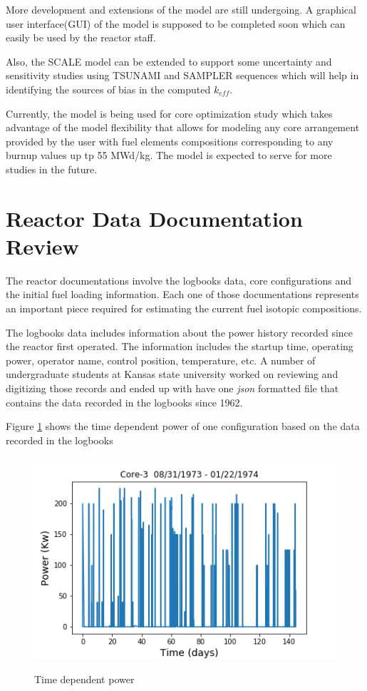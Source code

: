 \documentclass[review,number,sort&compress,12pt]{elsarticle}
\begin{document}
More development and extensions of the model are still undergoing. A graphical user interface(GUI) of the model is supposed to be completed soon which can easily be used by the reactor staff.

Also, the SCALE model can be extended to support some uncertainty and sensitivity studies using TSUNAMI and SAMPLER sequences which will help in identifying the sources of bias in the computed $k_{eff}$.

Currently, the model is being used for core optimization study which takes advantage of the model flexibility that allows for modeling any core arrangement provided by the user with fuel elements compositions corresponding to any burnup values up tp 55 MWd/kg. The model is expected to serve for more studies in the future.

\section{Reactor Data Documentation Review}
The reactor documentations involve the logbooks data, core configurations and the initial fuel loading information.
Each one of those documentations represents an important piece required for estimating the current fuel isotopic compositions.

The logbooks data includes information about the power history recorded since the reactor first operated. The information includes the startup time, operating power, operator name, control position, temperature, etc.
A number of undergraduate students at Kansas state university worked on reviewing and digitizing those records and ended up with have one \emph{json} formatted file that contains the data recorded in the logbooks since 1962. 

Figure \ref{fig:core3_power} shows the time dependent power of one configuration based on the data recorded in the logbooks

\begin{figure}[h]
\centering
\includegraphics[scale=0.8]{core3.png}\\
\caption{Time dependent power}
\label{fig:core3_power}
\end{figure}
\end{document}

